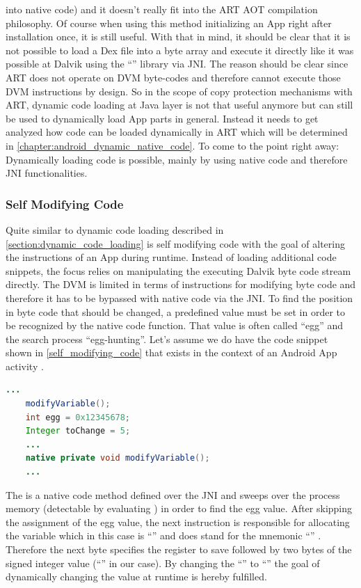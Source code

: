 into native code) and it doesn't really fit into the ART AOT compilation
philosophy. Of course when using this method initializing an App right after installation once, it is still useful.
With that in mind, it should be clear that it is not possible
to load a Dex file into a byte array and execute it directly like it was
possible at Dalvik using the ``'' library via JNI.
The reason should be clear since ART does not operate on DVM byte-codes and therefore cannot execute those DVM instructions by design.
So in the scope of copy protection mechanisms
with ART, dynamic code loading at Java layer is not that useful anymore
but can still be used to dynamically load App parts in general.
Instead it needs to get analyzed how code can be loaded dynamically in ART which will be determined in \autoref{chapter:android_dynamic_native_code}.
To come to the point right away: Dynamically loading code is possible, mainly
by using native code and therefore JNI functionalities.

\subsubsection{Self Modifying Code}
Quite similar to dynamic code loading described in
\autoref{section:dynamic_code_loading} is self modifying code with the goal
of altering the instructions of an App during runtime.
Instead of loading additional code snippets, the focus relies on
manipulating the executing Dalvik byte code stream directly.
The DVM is limited in terms of instructions for modifying byte code
and therefore it has to be bypassed with native code via the JNI.
To find the position in byte code that should be changed, a predefined
value must be set in order to be recognized by the native code function.
That value is often called ``egg'' and the search process ``egg-hunting''.
Let's assume we do have the code snippet shown in \autoref{self_modifying_code} that exists in the context of an Android App activity
\parencite{code_protection}.
 \begin{lstlisting}[language=Java, caption=Self Modifying Code Example, label=self_modifying_code]
    ...
    modifyVariable();
    int egg = 0x12345678;
    Integer toChange = 5;
    ...
    native private void modifyVariable();
    ...
\end{lstlisting}

The  is a native code method defined over the JNI
and sweeps over the process memory (detectable by evaluating
)
in order to find the egg value. After skipping the assignment of
the egg value, the next instruction is responsible for allocating
the  variable which in this case is ``''
and does stand for the mnemonic ``''
\parencite{bytecode_format}. Therefore the next byte specifies the
register to save followed by two bytes of the signed integer value
(``'' in our case). By changing the ``'' to
``'' the goal of dynamically changing the value at runtime
is hereby fulfilled.


